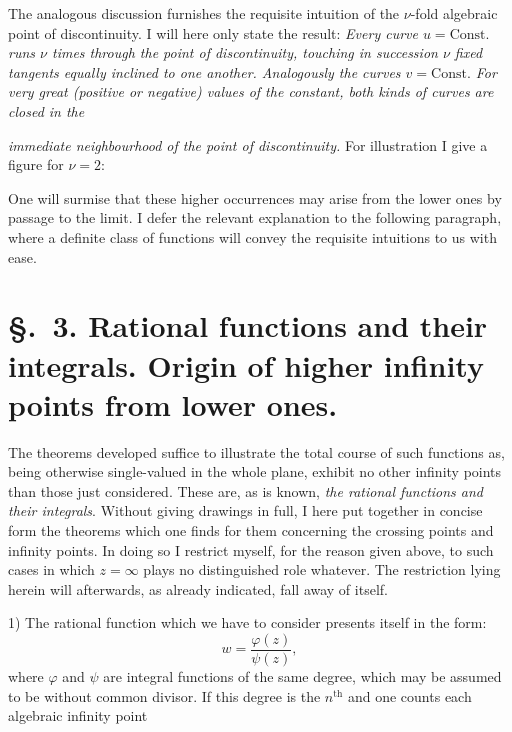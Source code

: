 \documentclass{article}
\begin{document}
The analogous discussion furnishes the requisite intuition of the $\nu$-fold algebraic point of discontinuity. I will here only state the result: \emph{Every curve $u = \text{Const.}$ runs $\nu$ times through the point of discontinuity, touching in succession $\nu$ fixed tangents equally inclined to one another. Analogously the curves $v = \text{Const.}$ For very great (positive or negative) values of the constant, both kinds of curves are closed in the}

\emph{immediate neighbourhood of the point of discontinuity.} For illustration I give a figure for $\nu = 2$:


One will surmise that these higher occurrences may arise from the lower ones by passage to the limit. I defer the relevant explanation to the following paragraph, where a definite class of functions will convey the requisite intuitions to us with ease.

\section*{§.~3. Rational functions and their integrals. Origin of higher infinity points from lower ones.}

The theorems developed suffice to illustrate the total course of such functions as, being otherwise single-valued in the whole plane, exhibit no other infinity points than those just considered. These are, as is known, \emph{the rational functions and their integrals}. Without giving drawings in full, I here put together in concise form the theorems which one finds for them concerning the crossing points and infinity points. In doing so I restrict myself, for the reason given above, to such cases in which $z = \infty$ plays no distinguished role whatever. The restriction lying herein will afterwards, as already indicated, fall away of itself.

1) The rational function which we have to consider presents itself in the form:
\[ w = \frac{\varphi(z)}{\psi(z)}, \]
where $\varphi$ and $\psi$ are integral functions of the same degree, which may be assumed to be without common divisor. If this degree is the $n^{\text{th}}$ and one counts each algebraic infinity point
\end{document}
